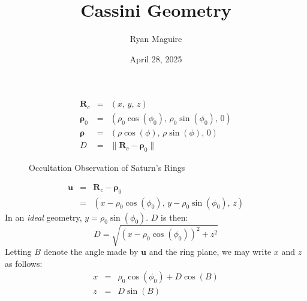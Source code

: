\documentclass{beamer}
\title{Cassini Geometry}
\author{Ryan Maguire}
\date{April 28, 2025}
\begin{document}
    \maketitle
    \begin{frame}
        \begin{equation}
            \begin{array}{rcl}
                \mathbf{R}_{c}
                &=&(x,\,y,\,z)\\[1em]
                \boldsymbol{\rho}_{0}
                &=&
                \left(
                    \rho_{0}\cos(\phi_{0}),\,\rho_{0}\sin(\phi_{0}),\,0
                \right)\\[1em]
                \boldsymbol{\rho}
                &=&
                \left(
                    \rho\cos(\phi),\,\rho\sin(\phi),\,0
                \right)\\[1em]
                D
                &=&
                \|\mathbf{R}_{c}-\boldsymbol{\rho}_{0}\|
            \end{array}
        \end{equation}
    \end{frame}
    \begin{frame}
        \begin{figure}
            \centering
            \caption{Occultation Observation of Saturn's Rings}
        \end{figure}
    \end{frame}
    \begin{frame}
        \begin{equation}
            \begin{array}{rcl}
                \mathbf{u}
                &=&
                \mathbf{R}_{c}-\boldsymbol{\rho}_{0}\\[1em]
                &=&
                \left(
                    x-\rho_{0}\cos(\phi_{0}),\,
                    y-\rho_{0}\sin(\phi_{0}),\,
                    z
                \right)
            \end{array}
        \end{equation}
        In an \textit{ideal} geometry, $y=\rho_{0}\sin(\phi_{0})$.
        $D$ is then:
        \begin{equation}
            D=\sqrt{\left(x-\rho_{0}\cos(\phi_{0})\right)^{2}+z^{2}}
        \end{equation}
        Letting $B$ denote the angle made by $\mathbf{u}$ and the ring plane,
        we may write $x$ and $z$ as follows:
        \begin{equation}
            \begin{array}{rcl}
                \displaystyle
                x
                &=&
                \displaystyle
                \rho_{0}\cos(\phi_{0})+D\cos(B)\\[1em]
                \displaystyle
                z
                &=&
                \displaystyle
                D\sin(B)
            \end{array}
        \end{equation}
    \end{frame}
\end{document}
